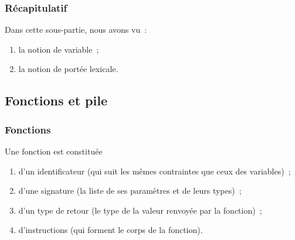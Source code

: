 \begin{frame}[fragile] \frametitle{Récapitulatif}
Dans cette sous-partie, nous avons vu~:

\begin{enumerate}
    \item la notion de variable~;
    \smallskip
    
    \item la notion de portée lexicale.
\end{enumerate}
\end{frame}

\subsection{Fonctions et pile}

\begin{frame}[fragile] \frametitle{Fonctions}
Une \alert{fonction} est constituée
\begin{enumerate}
    \item d'un identificateur (qui suit les mêmes contraintes que ceux des
    variables)~;
    \item d'une signature (la liste de ses paramètres et de leurs types)~;
    \item d'un type de retour (le type de la valeur renvoyée par la fonction)~;
    \item d'instructions (qui forment le corps de la fonction).
\end{enumerate}
\bigskip


\begin{semiverbatim}
\end{semiverbatim}
\end{frame}

